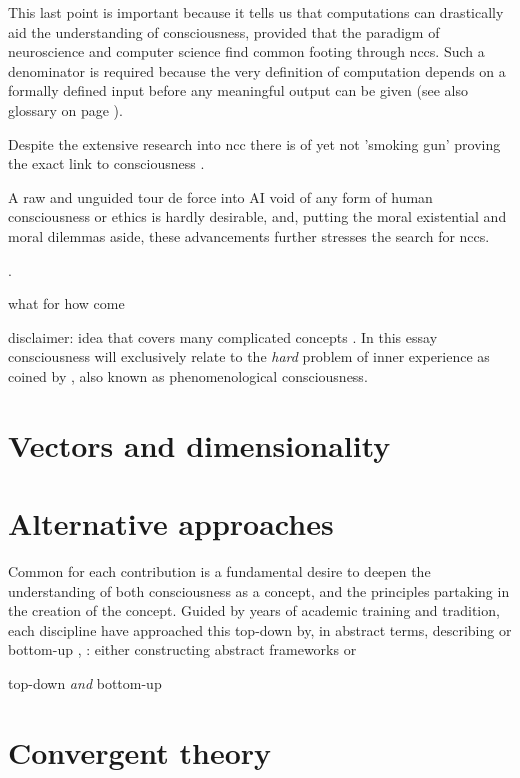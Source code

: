 \documentclass[a4paper,oneside]{memoir}
\begin{document}
This last point is important because it tells us that computations can
drastically aid the understanding of consciousness, provided that the
paradigm of neuroscience and computer science find common footing through
\gls{ncc}s. Such a denominator is required because the very definition of
computation depends on a formally defined input before any meaningful output
can be given \autocite{Nilsson2009, schmidhuber2014} (see also glossary on
page \pageref{glos}).

Despite the extensive research into \gls{ncc} there is of yet not 'smoking gun'
proving the exact link to consciousness \autocite{sep-consciousness, Hohwy2009, dennett2017}.



A raw and unguided tour de force into AI void of any form of human consciousness or
ethics is hardly desirable, and, putting the moral existential and moral dilemmas aside,
these advancements further stresses the search for \gls{ncc}s.

\autocite{dennett2017}.

what for
how come

disclaimer:
idea that covers many complicated concepts \autocite{sep-consciousness}. In this essay
consciousness will exclusively relate to the \textit{hard} problem of inner experience as
coined by \cite{chalmers1995}, also known as phenomenological consciousness.
\section{Vectors and dimensionality}

\section{Alternative approaches}
Common for each contribution is a fundamental desire to deepen the
understanding of both consciousness as a concept, and the principles
partaking in the creation of the concept. 
Guided by years of academic training and tradition, each discipline have
approached this \gls{top-down} by, in abstract terms, describing 
or \gls{bottom-up} \autocite{sep-consciousness},
: either constructing abstract
frameworks \autocite{block2007,kouider2010} or 

\gls{top-down} \textit{and} \gls{bottom-up} \autocite{dehaene2001, baars2005}
\section{Convergent theory}

\clearpage

\printglossary[Glossary]

\printbibliography
\end{document}
